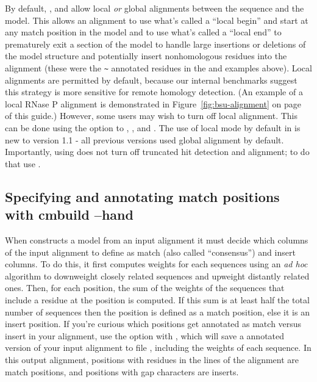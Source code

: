 By default, ,  and  allow
local \emph{or} global alignments between the sequence and the
model. This allows an alignment to use what's called a ``local begin''
and start at any match position in the model and to use what's called
a ``local end'' to prematurely exit a section of the model to handle
large insertions or deletions of the model structure and potentially
insert nonhomologous residues into the alignment (these were the
\verb+~+ annotated residues in the  and 
examples above). Local alignments are permitted by default, because
our internal benchmarks suggest this strategy is more sensitive for
remote homology detection. (An example of a local RNase P alignment is
demonstrated in Figure~\ref{fig:bsu-alignment} on
page~\pageref{fig:bsu-alignment} of this guide.)
However, some users may wish to turn off local alignment. This can be
done using the  option to , ,
and . The use of local mode by default in 
is new to version 1.1 - all previous versions used global alignment by
default. Importantly, using  does not turn off truncated hit
detection and alignment; to do that use .

\subsection{Specifying and annotating match positions with cmbuild --hand}

When  constructs a model from an input alignment it must
decide which columns of the input alignment to define as match (also
called ``consensus'') and insert columns. To do this, it first
computes weights for each sequences using an \emph{ad hoc} algorithm
to downweight closely related sequences and upweight distantly related
ones. Then, for each position, the sum of the weights of the sequences
that include a residue at the position is computed. If this sum is at
least half the total number of sequences then the position is defined
as a match position, else it is an insert position. If you're curious
which positions get annotated as match versus insert in your
alignment, use the  option with , which
will save a annotated version of your input alignment to file
, including the weights of each sequence. In this output
alignment, positions with residues in the  lines of
the alignment are match positions, and positions with gap characters
are inserts.

